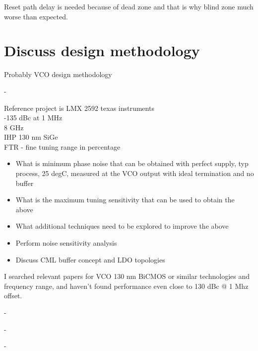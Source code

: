 \documentclass{article}
\begin{document}
Reset path delay is needed because of dead zone and that is why blind zone much worse than expected. %


\section{Discuss design methodology}

Probably VCO design methodology

\begin{question}
	-
\end{question}


Reference project is LMX 2592 texas instruments
\\
-135 dBc at  1 MHz %
\\
8 GHz
\\
IHP 130 nm SiGe
\\
FTR - fine tuning range in percentage

\begin{itemize}

	\item What is minimum phase noise that can be obtained with perfect supply, typ process, 25 degC, measured at the VCO output with ideal termination and no buffer
	\item What is the maximum  tuning sensitivity that can be used to obtain the above
	\item What additional techniques need to be explored to improve the above
	\item Perform noise sensitivity analysis 
	\item Discuss CML buffer concept and LDO topologies
	
\end{itemize}

I searched relevant papers for VCO 130 nm BiCMOS or similar technologies and frequency range, and haven't found performance even close to 130 dBc @ 1 Mhz offset. 

\begin{question}
	-
\end{question}

\begin{question}
	-
\end{question}

\begin{question}
	-
\end{question}
\end{document}
